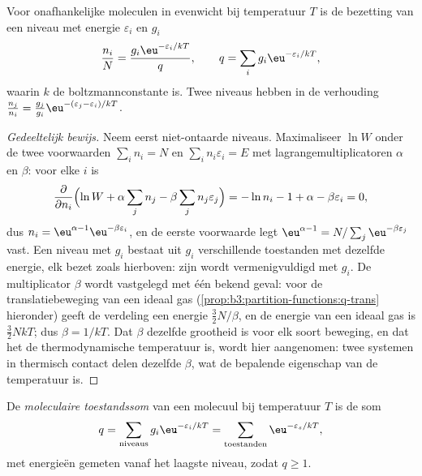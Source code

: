 \begin{theorem}[De boltzmannverdeling]\label{thm:b3:partition-functions:boltzmann}
Voor onafhankelijke moleculen in evenwicht bij temperatuur $T$ is de
bezetting van een niveau met energie $\varepsilon_i$ en  $g_i$
\[
  \frac{n_i}{N} = \frac{g_i\eu^{-\varepsilon_i/kT}}{q},
  \qquad q = \sum_i g_i\eu^{-\varepsilon_i/kT},
\]
waarin $k$ de boltzmannconstante is. Twee niveaus hebben  in de
verhouding
$\frac{n_j}{n_i} = \frac{g_j}{g_i}\eu^{-(\varepsilon_j - \varepsilon_i)/kT}$.
\end{theorem}

\begin{proof}[Gedeeltelijk bewijs]
Neem eerst niet-ontaarde niveaus. Maximaliseer $\ln W$ onder de twee
voorwaarden
$\sum_in_i = N$ en $\sum_in_i\varepsilon_i = E$ met lagrangemultiplicatoren $\alpha$ en $\beta$:
voor elke $i$ is
\[
  \frac{\partial}{\partial n_i}\Bigl(\ln W + \alpha\sum_jn_j - \beta\sum_jn_j\varepsilon_j\Bigr)
  = -\ln n_i - 1 + \alpha - \beta\varepsilon_i = 0,
\]
dus $n_i = \eu^{\alpha - 1}\eu^{-\beta\varepsilon_i}$, en de eerste voorwaarde legt $\eu^{\alpha - 1}
= N/\sum_j\eu^{-\beta\varepsilon_j}$ vast. Een niveau met  $g_i$ bestaat uit $g_i$
verschillende toestanden met dezelfde energie, elk bezet zoals hierboven:
zijn  wordt vermenigvuldigd met
$g_i$. De multiplicator $\beta$ wordt vastgelegd met één bekend geval: voor
de translatiebeweging van een ideaal gas (\cref{prop:b3:partition-functions:q-trans}
hieronder) geeft de verdeling een energie $\frac32N/\beta$, en de energie
van een ideaal gas is $\frac32NkT$; dus $\beta = 1/kT$. Dat $\beta$ dezelfde
grootheid is voor elk soort beweging, en dat het de thermodynamische
temperatuur is, wordt hier aangenomen: twee systemen in thermisch contact
delen dezelfde $\beta$, wat de bepalende eigenschap van de temperatuur is.
\end{proof}

\begin{definition}\label{def:b3:partition-functions:partition-function}
De \emph{moleculaire toestandssom} van een
molecuul bij temperatuur $T$ is de som
\[
  q = \sum_{\text{niveaus}}g_i\eu^{-\varepsilon_i/kT} = \sum_{\text{toestanden}}\eu^{-\varepsilon_s/kT},
\]
met energieën gemeten vanaf het laagste niveau, zodat $q \ge 1$.
\end{definition}

